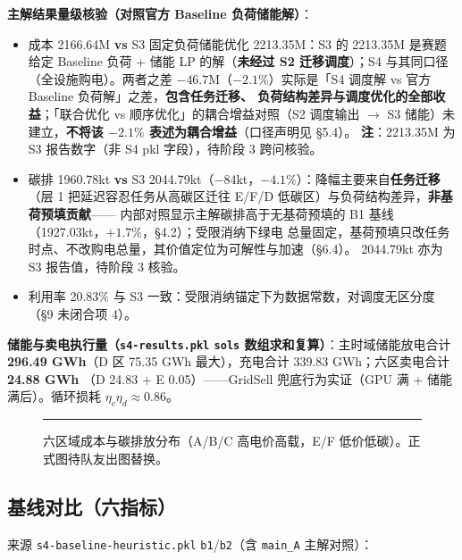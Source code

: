 \documentclass{internal-report}
\begin{document}
\textbf{主解结果量级核验（对照官方 Baseline 负荷储能解）}：
\begin{itemize}
  \item 成本 2166.64M \textbf{vs} S3 固定负荷储能优化 2213.35M：S3 的 2213.35M 是赛题给定 Baseline
        负荷 + 储能 LP 的解（\textbf{未经过 S2 迁移调度}）；S4 与其同口径（全设施购电）。两者之差
        $-46.7$M（$-2.1\%$）实际是「S4 调度解 vs 官方 Baseline 负荷解」之差，\textbf{包含任务迁移、
        负荷结构差异与调度优化的全部收益}；「联合优化 vs 顺序优化」的耦合增益对照（S2 调度输出
        $\to$ S3 储能）未建立，\textbf{不将该 $-2.1\%$ 表述为耦合增益}（口径声明见 §5.4）。
        \textbf{注}：2213.35M 为 S3 报告数字（非 S4 pkl 字段），待阶段 3 跨问核验。
  \item 碳排 1960.78kt \textbf{vs} S3 2044.79kt（$-84$kt，$-4.1\%$）：降幅主要来自\textbf{任务迁移}
        （层 1 把延迟容忍任务从高碳区迁往 E/F/D 低碳区）与负荷结构差异，\textbf{非基荷预填贡献}——
        内部对照显示主解碳排高于无基荷预填的 B1 基线（1927.03kt，$+1.7\%$，§4.2）；受限消纳下绿电
        总量固定，基荷预填只改任务时点、不改购电总量，其价值定位为可解性与加速（§6.4）。
        2044.79kt 亦为 S3 报告值，待阶段 3 核验。
  \item 利用率 20.83\% 与 S3 一致：受限消纳锚定下为数据常数，对调度无区分度（§9 未闭合项 4）。
\end{itemize}

\textbf{储能与卖电执行量（\texttt{s4-results.pkl} \texttt{sols} 数组求和复算）}：主时域储能放电合计
\textbf{296.49 GWh}（D 区 75.35 GWh 最大），充电合计 339.83 GWh；六区卖电合计 \textbf{24.88 GWh}
（D 24.83 + E 0.05）——GridSell 兜底行为实证（GPU 满 + 储能满后）。循环损耗
$\eta_c\eta_d\approx 0.86$。

\begin{figure}[H]
\centering
\rule{0.9\textwidth}{4cm}
\caption{六区域成本与碳排放分布（A/B/C 高电价高载，E/F 低价低碳）。正式图待队友出图替换。}
\label{fig:region}
\end{figure}

\subsection{基线对比（六指标）}
\label{sec:baseline-cmp}

来源 \texttt{s4-baseline-heuristic.pkl} \texttt{b1}/\texttt{b2}（含 \texttt{main\_A} 主解对照）：
\end{document}
